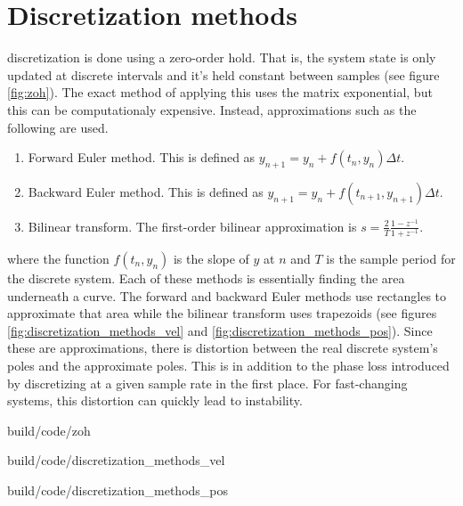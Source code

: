 \section{Discretization methods}
\label{sec:discretization_methods}

\Gls{discretization} is done using a zero-order hold. That is, the \gls{system}
\gls{state} is only updated at discrete intervals and it's held constant between
samples (see figure \ref{fig:zoh}). The exact method of applying this uses the
matrix exponential, but this can be computationaly expensive. Instead,
approximations such as the following are used.

\begin{enumerate}
  \item Forward Euler method. This is defined as
    $y_{n+1} = y_n + f(t_n, y_n) \Delta t$.
  \item Backward Euler method. This is defined as
    $y_{n+1} = y_n + f(t_{n+1}, y_{n+1}) \Delta t$.
  \item Bilinear transform. The first-order bilinear approximation is
    $s = \frac{2}{T} \frac{1 - z^{-1}}{1 + z^{-1}}$.
\end{enumerate}

where the function $f(t_n, y_n)$ is the slope of $y$ at $n$ and $T$ is the
sample period for the discrete \gls{system}. Each of these methods is
essentially finding the area underneath a curve. The forward and backward Euler
methods use rectangles to approximate that area while the bilinear transform
uses trapezoids (see figures \ref{fig:discretization_methods_vel} and
\ref{fig:discretization_methods_pos}). Since these are approximations, there is
distortion between the real discrete \gls{system}'s poles and the approximate
poles. This is in addition to the phase loss introduced by discretizing at a
given sample rate in the first place. For fast-changing \glspl{system}, this
distortion can quickly lead to instability.

\begin{svg}{build/code/zoh}
    \caption{Zero-order hold of a system response}
    \label{fig:zoh}
\end{svg}

\begin{svg}{build/code/discretization_methods_vel}
  \caption{Discretization methods applied to velocity data}
  \label{fig:discretization_methods_vel}
\end{svg}

\begin{svg}{build/code/discretization_methods_pos}
  \caption{Position plot of discretization methods applied to velocity data}
  \label{fig:discretization_methods_pos}
\end{svg}
